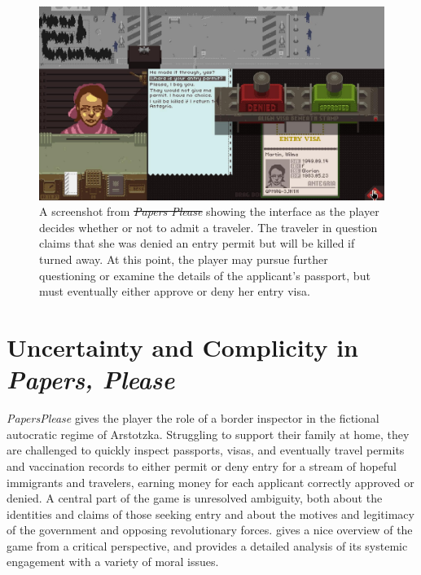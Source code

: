 \documentclass[arts,article,submit,moreauthors,pdftex,10pt,a4paper]{Definitions/mdpi}
\providecommand{\DIFadd}[1]{{\protect\color{blue}\uwave{#1}}} %
\providecommand{\DIFdel}[1]{{\protect\color{red}\sout{#1}}}                      %
\providecommand{\DIFaddbegin}{} %
\providecommand{\DIFaddend}{} %
\providecommand{\DIFdelbegin}{} %
\providecommand{\DIFdelend}{} %
\providecommand{\DIFaddFL}[1]{\DIFadd{#1}} %
\providecommand{\DIFdelFL}[1]{\DIFdel{#1}} %
\providecommand{\DIFaddbeginFL}{} %
\providecommand{\DIFaddendFL}{} %
\providecommand{\DIFdelbeginFL}{} %
\providecommand{\DIFdelendFL}{} %
\begin{document}
\begin{figure}[t]
  \DIFaddendFL \includegraphics[width=\textwidth]{fig/papers-please-visa-choice.png}
  \caption{A screenshot from \DIFdelbeginFL \emph{\DIFdelFL{Papers Please}} %
\DIFdelendFL \DIFaddbeginFL \emph{\DIFaddFL{Papers, Please}} \DIFaddendFL showing the interface as the player decides whether or not to admit a traveler. The traveler in question claims that she was denied an entry permit but will be killed if turned away. At this point, the player may pursue further questioning or examine the details of the applicant's passport, but must eventually either approve or deny her entry visa.}
  \label{fig:PP_visa}
\end{figure}



\DIFdelbegin %
\DIFdelend \DIFaddbegin \section{Uncertainty and Complicity in \emph{Papers, Please}}
\DIFaddend 

\emph{Papers\DIFaddbegin \DIFadd{, }\DIFaddend Please} \citep{pope2013papers} gives the player the role of a border inspector in the fictional autocratic regime of Arstotzka.
%
Struggling to support their family at home, they are challenged to quickly inspect passports, visas, and eventually travel permits and vaccination records to either permit or deny entry for a stream of hopeful immigrants and travelers, earning money for each applicant correctly approved or denied.
%
A central part of the game is unresolved ambiguity, both about the identities and claims of those seeking entry and about the motives and legitimacy of the government and opposing revolutionary forces.
%
\cite{alexander2013designing} gives a nice overview of the game from a critical perspective, and \cite{formosa2016papers} provides a detailed analysis of its systemic engagement with a variety of moral issues.
\end{document}
